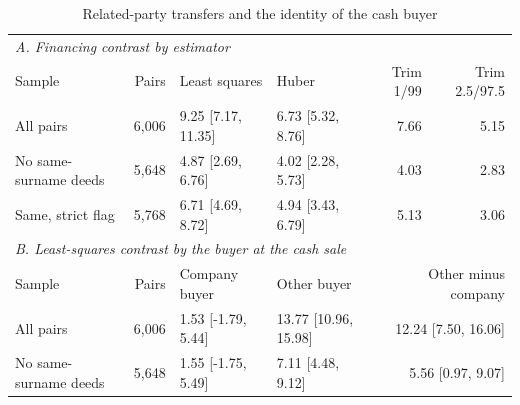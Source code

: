\begin{table}[htbp]\centering\footnotesize\setlength{\tabcolsep}{3pt}
\caption{Related-party transfers and the identity of the cash buyer}\label{tab:related}
\begin{tabular}{lrllrr}\toprule
\multicolumn{6}{l}{\textit{A. Financing contrast by estimator}}\\
Sample & Pairs & Least squares & Huber & Trim 1/99 & Trim 2.5/97.5 \\
\midrule
All pairs & 6,006 & 9.25 [7.17, 11.35] & 6.73 [5.32, 8.76] & 7.66 & 5.15 \\
No same-surname deeds & 5,648 & 4.87 [2.69, 6.76] & 4.02 [2.28, 5.73] & 4.03 & 2.83 \\
Same, strict flag & 5,768 & 6.71 [4.69, 8.72] & 4.94 [3.43, 6.79] & 5.13 & 3.06 \\
\midrule
\multicolumn{6}{l}{\textit{B. Least-squares contrast by the buyer at the cash sale}}\\
Sample & Pairs & Company buyer & Other buyer & \multicolumn{2}{r}{Other minus company} \\
\midrule
All pairs & 6,006 & 1.53 [-1.79, 5.44] & 13.77 [10.96, 15.98] & \multicolumn{2}{r}{12.24 [7.50, 16.06]} \\
No same-surname deeds & 5,648 & 1.55 [-1.75, 5.49] & 7.11 [4.48, 9.12] & \multicolumn{2}{r}{5.56 [0.97, 9.07]} \\
\bottomrule\end{tabular}
\end{table}
